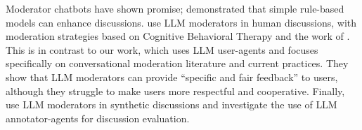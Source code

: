 Moderator chatbots have shown promise; \citet{kim_et_al_chatbot} demonstrated that simple rule-based models can enhance discussions. \citet{cho-etal-2024-language} use \ac{LLM} moderators in human discussions, with moderation strategies based on Cognitive Behavioral Therapy and the work of \citet{rosenberg2015nonviolent}. This is in contrast to our work, which uses \ac{LLM} user-agents and focuses specifically on conversational moderation literature and current practices. They show that \ac{LLM} moderators can provide “specific and fair feedback” to users, although they struggle to make users more respectful and cooperative. Finally, \citet{dtsirmpas_thesis} use \ac{LLM} moderators in synthetic discussions and investigate the use of \ac{LLM} annotator-agents for discussion evaluation.